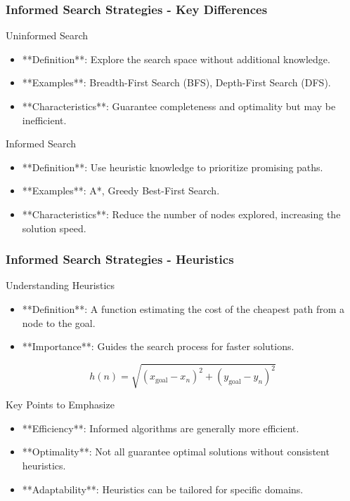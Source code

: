 \documentclass[aspectratio=169]{beamer}
\begin{document}
\begin{frame}[fragile]
    \frametitle{Informed Search Strategies - Key Differences}
    \begin{block}{Uninformed Search}
        \begin{itemize}
            \item **Definition**: Explore the search space without additional knowledge.
            \item **Examples**: Breadth-First Search (BFS), Depth-First Search (DFS).
            \item **Characteristics**: Guarantee completeness and optimality but may be inefficient.
        \end{itemize}
    \end{block}
    
    \begin{block}{Informed Search}
        \begin{itemize}
            \item **Definition**: Use heuristic knowledge to prioritize promising paths.
            \item **Examples**: A*, Greedy Best-First Search.
            \item **Characteristics**: Reduce the number of nodes explored, increasing the solution speed.
        \end{itemize}
    \end{block}
\end{frame}

\begin{frame}[fragile]
    \frametitle{Informed Search Strategies - Heuristics}
    \begin{block}{Understanding Heuristics}
        \begin{itemize}
            \item **Definition**: A function estimating the cost of the cheapest path from a node to the goal.
            \item **Importance**: Guides the search process for faster solutions.
        \end{itemize}
    \end{block}

    \begin{equation}
        h(n) = \sqrt{(x_{\text{goal}} - x_{n})^2 + (y_{\text{goal}} - y_{n})^2}
    \end{equation}

    \begin{block}{Key Points to Emphasize}
        \begin{itemize}
            \item **Efficiency**: Informed algorithms are generally more efficient.
            \item **Optimality**: Not all guarantee optimal solutions without consistent heuristics.
            \item **Adaptability**: Heuristics can be tailored for specific domains.
        \end{itemize}
    \end{block}
\end{frame}
\end{document}

